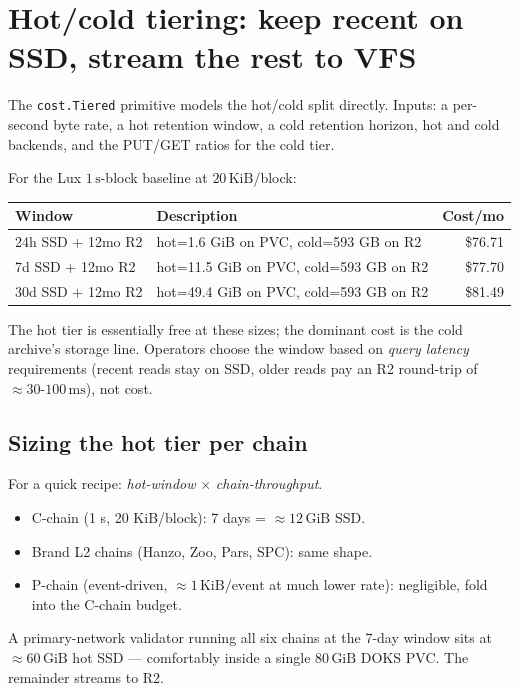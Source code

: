 \documentclass[11pt,a4paper]{article}
\begin{document}
\section{Hot/cold tiering: keep recent on SSD, stream the rest to VFS}
\label{sec:tiering}

The \texttt{cost.Tiered} primitive models the hot/cold split directly.
Inputs: a per-second byte rate, a hot retention window, a cold
retention horizon, hot and cold backends, and the PUT/GET ratios for
the cold tier.

For the Lux $1\,\text{s}$-block baseline at $20\,\text{KiB}$/block:

\begin{tabularx}{\linewidth}{lXr}
\toprule
\textbf{Window} & \textbf{Description} & \textbf{Cost/mo} \\
\midrule
24h SSD + 12mo R2  & hot=1.6 GiB on PVC, cold=593 GB on R2 & \$76.71 \\
7d  SSD + 12mo R2  & hot=11.5 GiB on PVC, cold=593 GB on R2 & \$77.70 \\
30d SSD + 12mo R2  & hot=49.4 GiB on PVC, cold=593 GB on R2 & \$81.49 \\
\bottomrule
\end{tabularx}

\noindent
The hot tier is essentially free at these sizes; the dominant cost is
the cold archive's storage line. Operators choose the window based on
\emph{query latency} requirements (recent reads stay on SSD, older
reads pay an R2 round-trip of $\approx 30\text{-}100\,\text{ms}$), not
cost.

\subsection{Sizing the hot tier per chain}

For a quick recipe: \emph{hot-window} $\times$ \emph{chain-throughput}.

\begin{itemize}[noitemsep]
  \item C-chain (1 s, 20 KiB/block): 7 days = $\approx 12\,\text{GiB}$ SSD.
  \item Brand L2 chains (Hanzo, Zoo, Pars, SPC): same shape.
  \item P-chain (event-driven, $\approx 1\,\text{KiB/event}$ at much
    lower rate): negligible, fold into the C-chain budget.
\end{itemize}

A primary-network validator running all six chains at the 7-day window
sits at $\approx 60\,\text{GiB}$ hot SSD --- comfortably inside a single
$80\,\text{GiB}$ DOKS PVC. The remainder streams to R2.
\end{document}
